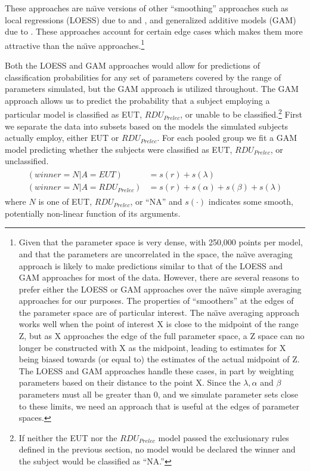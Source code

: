 \documentclass[../main.tex]{subfiles}
\begin{document}
These approaches are na{\"\i}ve versions of other \enquote{smoothing} approaches such as local regressions (LOESS) due to \textcite{Cleveland1979} and \textcite{Cleveland1992}, and generalized additive models (GAM) due to \textcite{Hastie1986}.
These approaches account for certain edge cases which makes them more attractive than the na{\"\i}ve approaches.\footnote{
	Given that the parameter space is very dense, with 250,000 points per model, and that the parameters are uncorrelated in the space, the na{\"\i}ve averaging approach is likely to make predictions similar to that of the LOESS and GAM approaches for most of the data.
	However, there are several reasons to prefer either the LOESS or GAM approaches over the na{\"\i}ve simple averaging approaches for our purposes.
    The properties of \enquote{smoothers} at the edges of the parameter space are of particular interest.
	The na{\"\i}ve averaging approach works well when the point of interest X is close to the midpoint of the range Z, but as X approaches the edge of the full parameter space, a Z space can no longer be constructed with X as the midpoint, leading to estimates for X being biased towards (or equal to) the estimates of the actual midpoint of Z.
	The LOESS and GAM approaches handle these cases, in part by weighting parameters based on their distance to the point X.
	Since the $\lambda, \alpha$ and $\beta$ parameters must all be greater than 0, and we simulate parameter sets close to these limits, we need an approach that is useful at the edges of parameter spaces.
}

Both the LOESS and GAM approaches would allow for predictions of classification probabilities for any set of parameters covered by the range of parameters simulated, but the GAM approach is utilized throughout.
The GAM approach allows us to predict the probability that a subject employing a particular model is classified as EUT, $\mathit{RDU_{Prelec}}$, or unable to be classified.\footnote{
	If neither the EUT nor the $\mathit{RDU_{Prelec}}$ model passed the exclusionary rules defined in the previous section, no model would be declared the winner and the subject would be classified as \enquote{NA.}
}
First we separate the data into subsets based on the models the simulated subjects actually employ, either EUT or $\mathit{RDU_{Prelec}}$.
For each pooled group we fit a GAM model predicting whether the subjects were classified as EUT, $\mathit{RDU_{Prelec}}$, or unclassified.
\begin{align}
	\label{eq4:GAM}
	\begin{split}
		(winner = N | A = EUT)                   &= s(r) + s(\lambda)\\
		(winner = N | A = \mathit{RDU_{Prelec}}) &= s(r) + s(\alpha) + s(\beta) + s(\lambda)
	\end{split}
\end{align}
\noindent where $N$ is one of EUT, $\mathit{RDU_{Prelec}}$, or \enquote{NA} and $s(\cdot)$ indicates some smooth, potentially non-linear function of its arguments.
\end{document}
